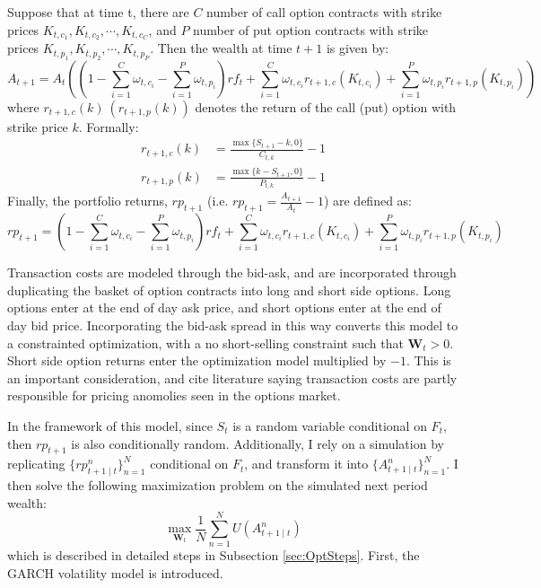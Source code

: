 Suppose that at time t, there are $C$ number of call option contracts with strike prices $K_{t, c_{1}}, K_{t, c_{2}}, \dotsb, K_{t, c_{C}}$, and $P$ number of put option contracts with strike prices $K_{t, p_{1}}, K_{t, p_{2}}, \dotsb, K_{t, p_{P}}$. Then the wealth at time $t + 1$ is given by:
\noindent
\[A_{t+1} = A_{t}((1 - \sum_{i = 1}^{C} \omega_{t, c_{i}} - \sum_{i = 1}^{P} \omega_{t, p_{i}}) rf_{t} + \sum_{i = 1}^{C} \omega_{t, c_{i}} r_{t + 1, c} (K_{t, c_{i}}) + \sum_{i = 1}^{P} \omega_{t, p_{i}} r_{t + 1, p}(K_{t, p_{i}}))\]
\noindent
where $r_{t + 1, c}(k) \ (r_{t + 1, p}(k))$ denotes the return of the call (put) option with strike price $k$. Formally:
\noindent
\begin{align}
\nonumber r_{t+1, c}(k) & = \frac{\max \{S_{t + 1} - k, 0\}}{C_{t, k}} - 1
\\ \nonumber r_{t+1, p}(k) &= \frac{\max \{k - S_{t + 1}, 0\}}{P_{t, k}} - 1
\end{align}
\noindent
Finally, the portfolio returns, $rp_{t + 1}$ (i.e. $rp_{t + 1} = \frac{A_{t + 1}}{A_{t}} - 1$) are defined as:
\noindent
\[r p_{t+1} = (1 - \sum_{i = 1}^{C} \omega_{t, c_{i}} - \sum_{i = 1}^{P} \omega_{t, p_{i}}) rf_{t} + \sum_{i = 1}^{C} \omega_{t, c_{i}} r_{t+1, c}(K_{t, c_{i}})+ \sum_{i=1}^{P} \omega_{t, p_{i}} r_{t+1, p}(K_{t, p_{i}})\]

Transaction costs are modeled through the bid-ask, and are incorporated through duplicating the basket of option contracts into long and short side options. Long options enter at the end of day ask price, and short options enter at the end of day bid price. Incorporating the bid-ask spread in this way converts this model to a constrainted optimization, with a no short-selling constraint such that $\mathbf{W}_{t} > 0$. Short side option returns enter the optimization model multiplied by $-1$. This is an important consideration, and \cite{faias2017optimal} cite literature saying transaction costs are partly responsible for pricing anomolies seen in the options market.

In the framework of this model, since $S_{t}$ is a random variable conditional on $F_{t}$, then $rp_{t + 1}$ is also conditionally random. Additionally, I rely on a simulation by replicating $\{rp_{t+1 \mid t}^{n}\}_{n=1}^{N}$ conditional on $F_{t}$, and transform it into $\{A_{t+1 \mid t}^{n}\}_{n=1}^{N}$. I then solve the following maximization problem on the simulated next period wealth:
\noindent
\[\max_{\mathbf{W}_{t}} \frac{1}{N} \sum_{n=1}^{N} U(A_{t+1 \mid t}^{n})\]
\noindent
which is described in detailed steps in Subsection \ref{sec:OptSteps}. First, the GARCH volatility model is introduced.


